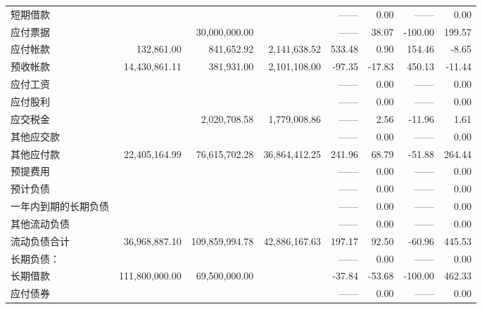 \begin{longtable}{>{\scriptsize}p{8em}>{\scriptsize}r>{\scriptsize}r>{\scriptsize}r>{\scriptsize}r>{\scriptsize}r>{\scriptsize}r>{\scriptsize}r}
\hspace{2ex}短期借款	&		&		&		&	——	&	0.00	&	——	&	0.00	\\
\hspace{2ex}应付票据	&		&	30,000,000.00	&		&	——	&	38.07	&	-100.00	&	199.57	\\
\hspace{2ex}应付帐款	&	132,861.00	&	841,652.92	&	2,141,638.52	&	533.48	&	0.90	&	154.46	&	-8.65	\\
\hspace{2ex}预收帐款	&	14,430,861.11	&	381,931.00	&	2,101,108.00	&	-97.35	&	-17.83	&	450.13	&	-11.44	\\
\hspace{2ex}应付工资	&		&		&		&	——	&	0.00	&	——	&	0.00	\\
\hspace{2ex}应付股利	&		&		&		&	——	&	0.00	&	——	&	0.00	\\
\hspace{2ex}应交税金	&		&	2,020,708.58	&	1,779,008.86	&	——	&	2.56	&	-11.96	&	1.61	\\
\hspace{2ex}其他应交款	&		&		&		&	——	&	0.00	&	——	&	0.00	\\
\hspace{2ex}其他应付款	&	22,405,164.99	&	76,615,702.28	&	36,864,412.25	&	241.96	&	68.79	&	-51.88	&	264.44	\\
\hspace{2ex}预提费用	&		&		&		&	——	&	0.00	&	——	&	0.00	\\
\hspace{2ex}预计负债	&		&		&		&	——	&	0.00	&	——	&	0.00	\\
\hspace{2ex}一年内到期的长期负债	&		&		&		&	——	&	0.00	&	——	&	0.00	\\
\hspace{2ex}其他流动负债	&		&		&		&	——	&	0.00	&	——	&	0.00	\\
\hspace{2ex}\hspace{2ex}\hspace{2ex}  流动负债合计	&	36,968,887.10	&	109,859,994.78	&	42,886,167.63	&	197.17	&	92.50	&	-60.96	&	445.53	\\
\midrule
长期负债：	&		&		&		&	——	&	0.00	&	——	&	0.00	\\
\hspace{2ex}长期借款	&	111,800,000.00	&	69,500,000.00	&		&	-37.84	&	-53.68	&	-100.00	&	462.33	\\
\hspace{2ex}应付债券	&		&		&		&	——	&	0.00	&	——	&	0.00	\\

\end{longtable}
